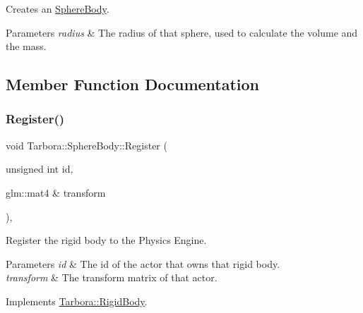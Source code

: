 Creates an \hyperlink{classTarbora_1_1SphereBody}{Sphere\+Body}. 


\begin{DoxyParams}{Parameters}
{\em radius} & The radius of that sphere, used to calculate the volume and the mass. \\
\hline
\end{DoxyParams}


\subsection{Member Function Documentation}
\mbox{\label{classTarbora_1_1SphereBody_aa4c177c62075afa568b73ec019201dd7}} 
\subsubsection{\texorpdfstring{Register()}{Register()}}
{\footnotesize\ttfamily void Tarbora\+::\+Sphere\+Body\+::\+Register (\begin{DoxyParamCaption}\item[{unsigned int}]{id,  }\item[{glm\+::mat4 \&}]{transform }\end{DoxyParamCaption})\hspace{0.3cm}{\ttfamily [override]}, {\ttfamily [virtual]}}



Register the rigid body to the Physics Engine. 


\begin{DoxyParams}{Parameters}
{\em id} & The id of the actor that owns that rigid body. \\
\hline
{\em transform} & The transform matrix of that actor. \\
\hline
\end{DoxyParams}


Implements \hyperlink{classTarbora_1_1RigidBody_a5f41c214aabe2a7f069a317cb755f0f1}{Tarbora\+::\+Rigid\+Body}.

\mbox{\label{classTarbora_1_1SphereBody_a218bff80687143aff24f524cc01f2175}} 
